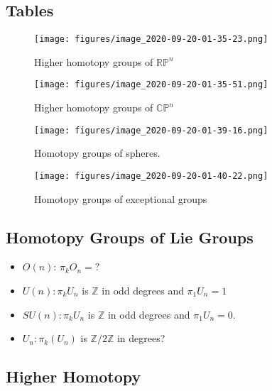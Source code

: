 \hypertarget{tables}{%
\subsection{Tables}\label{tables}}

\begin{figure}
\centering
\texttt{[image: figures/image\_2020-09-20-01-35-23.png]}
\caption{Higher homotopy groups of \({\mathbb{RP}}^n\)}
\end{figure}

\begin{figure}
\centering
\texttt{[image: figures/image\_2020-09-20-01-35-51.png]}
\caption{Higher homotopy groups of \({\mathbb{CP}}^n\)}
\end{figure}

\begin{figure}
\centering
\texttt{[image: figures/image\_2020-09-20-01-39-16.png]}
\caption{Homotopy groups of spheres.}
\end{figure}

\begin{figure}
\centering
\texttt{[image: figures/image\_2020-09-20-01-40-22.png]}
\caption{Homotopy groups of exceptional groups}
\end{figure}

\hypertarget{homotopy-groups-of-lie-groups}{%
\subsection{Homotopy Groups of Lie
Groups}\label{homotopy-groups-of-lie-groups}}

\begin{itemize}
\tightlist
\item
  \(O(n)\): \(\pi_k O_n = ?\)
\item
  \(U(n): \pi_k U_n\) is \({\mathbb{Z}}\) in odd degrees and
  \(\pi_1 U_n = 1\) 
\item
  \(SU(n): \pi_k U_n\) is \({\mathbb{Z}}\) in odd degrees and
  \(\pi_1 U_n = 0\).
\item
  \(U_n: \pi_k(U_n)\) is \({\mathbb{Z}}/2{\mathbb{Z}}\) in degrees?
\end{itemize}

\hypertarget{higher-homotopy}{%
\subsection{Higher Homotopy}\label{higher-homotopy}}

